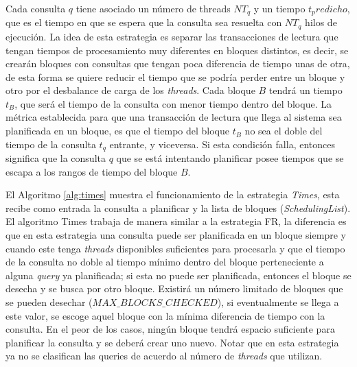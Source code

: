 Cada consulta $q$ tiene asociado un número de threads $NT_q$ y un tiempo $t_predicho$, que es el tiempo en que se espera que la consulta sea resuelta con $NT_q$ hilos de ejecución. La idea de esta estrategia es separar las transacciones de lectura que tengan tiempos de procesamiento muy diferentes en bloques distintos, es decir, se crearán bloques con consultas que tengan poca diferencia de tiempo unas de otra, de esta forma se quiere reducir el tiempo que se podría perder entre un bloque y otro por el desbalance de carga de los \textit{threads}. Cada bloque $B$ tendrá un tiempo $t_B$, que será el tiempo de la consulta con menor tiempo dentro del bloque. La métrica establecida para que una transacción de lectura que llega al sistema sea planificada en un bloque, es que el tiempo del bloque $t_B$ no sea el doble del tiempo de la consulta $t_q$ entrante, y viceversa. Si esta condición falla, entonces significa que la consulta $q$ que se está intentando planificar posee tiempos que se escapa a los rangos de tiempo del bloque $B$.

El Algoritmo \ref{alg:times} muestra el funcionamiento de la estrategia \textit{Times}, esta recibe como entrada la consulta a planificar y la lista de bloques (\textit{SchedulingList}). El algoritmo Times trabaja de manera similar a la estrategia FR, la diferencia es que en esta estrategia una consulta puede ser planificada en un bloque siempre y cuando este tenga \textit{threads} disponibles suficientes para procesarla y que el tiempo de la consulta no doble al tiempo mínimo dentro del bloque perteneciente a alguna \textit{query} ya planificada; si esta no puede ser planificada, entonces el bloque se desecha y se busca por otro bloque. Existirá un número limitado de bloques que se pueden desechar (\textit{$MAX\_BLOCKS\_CHECKED$}), si eventualmente se llega a este valor, se escoge aquel bloque con la mínima diferencia de tiempo con la consulta. En el peor de los casos, ningún bloque tendrá espacio suficiente para planificar la consulta y se deberá crear uno nuevo. Notar que en esta estrategia ya no se clasifican las queries de acuerdo al número de \textit{threads} que utilizan. 

